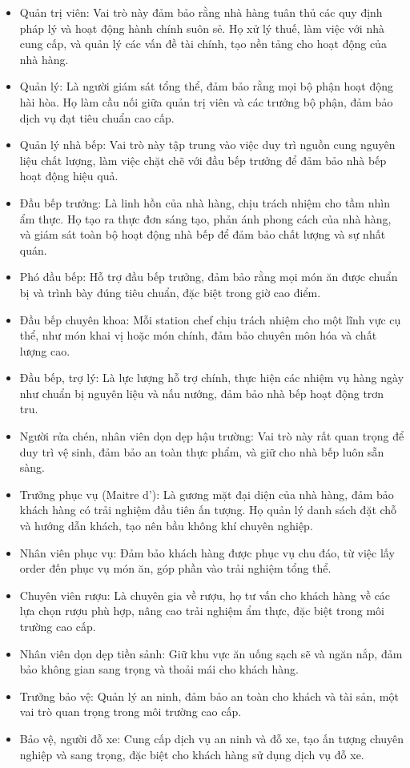 \begin{itemize}
	\item Quản trị viên: Vai trò này đảm bảo rằng nhà hàng tuân thủ các quy định pháp lý và hoạt động hành chính suôn sẻ. Họ xử lý thuế, làm việc với nhà cung cấp, và quản lý các vấn đề tài chính, tạo nền tảng cho hoạt động của nhà hàng.
	\item Quản lý: Là người giám sát tổng thể, đảm bảo rằng mọi bộ phận hoạt động hài hòa. Họ làm cầu nối giữa quản trị viên và các trưởng bộ phận, đảm bảo dịch vụ đạt tiêu chuẩn cao cấp.
	\item Quản lý nhà bếp: Vai trò này tập trung vào việc duy trì nguồn cung nguyên liệu chất lượng, làm việc chặt chẽ với đầu bếp trưởng để đảm bảo nhà bếp hoạt động hiệu quả.
	\item Đầu bếp trưởng: Là linh hồn của nhà hàng, chịu trách nhiệm cho tầm nhìn ẩm thực. Họ tạo ra thực đơn sáng tạo, phản ánh phong cách của nhà hàng, và giám sát toàn bộ hoạt động nhà bếp để đảm bảo chất lượng và sự nhất quán.
	\item Phó đầu bếp: Hỗ trợ đầu bếp trưởng, đảm bảo rằng mọi món ăn được chuẩn bị và trình bày đúng tiêu chuẩn, đặc biệt trong giờ cao điểm.
	\item Đầu bếp chuyên khoa: Mỗi station chef chịu trách nhiệm cho một lĩnh vực cụ thể, như món khai vị hoặc món chính, đảm bảo chuyên môn hóa và chất lượng cao.
	\item Đầu bếp, trợ lý: Là lực lượng hỗ trợ chính, thực hiện các nhiệm vụ hàng ngày như chuẩn bị nguyên liệu và nấu nướng, đảm bảo nhà bếp hoạt động trơn tru.
	\item Người rửa chén, nhân viên dọn dẹp hậu trường: Vai trò này rất quan trọng để duy trì vệ sinh, đảm bảo an toàn thực phẩm, và giữ cho nhà bếp luôn sẵn sàng.
	\item Trưởng phục vụ (Maitre d'): Là gương mặt đại diện của nhà hàng, đảm bảo khách hàng có trải nghiệm đầu tiên ấn tượng. Họ quản lý danh sách đặt chỗ và hướng dẫn khách, tạo nên bầu không khí chuyên nghiệp.
	\item Nhân viên phục vụ: Đảm bảo khách hàng được phục vụ chu đáo, từ việc lấy order đến phục vụ món ăn, góp phần vào trải nghiệm tổng thể.
	\item Chuyên viên rượu: Là chuyên gia về rượu, họ tư vấn cho khách hàng về các lựa chọn rượu phù hợp, nâng cao trải nghiệm ẩm thực, đặc biệt trong môi trường cao cấp.
	\item Nhân viên dọn dẹp tiền sảnh: Giữ khu vực ăn uống sạch sẽ và ngăn nắp, đảm bảo không gian sang trọng và thoải mái cho khách hàng.
	\item Trưởng bảo vệ: Quản lý an ninh, đảm bảo an toàn cho khách và tài sản, một vai trò quan trọng trong môi trường cao cấp.
	\item Bảo vệ, người đỗ xe: Cung cấp dịch vụ an ninh và đỗ xe, tạo ấn tượng chuyên nghiệp và sang trọng, đặc biệt cho khách hàng sử dụng dịch vụ đỗ xe.
\end{itemize}

